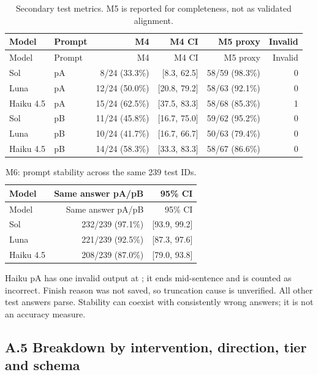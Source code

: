 \begingroup\small\setlength{\tabcolsep}{4pt}
\begin{longtable}{llrrrr}
\caption{Secondary test metrics. M5 is reported for completeness, not as validated alignment.}\\
\toprule
Model & Prompt & M4 & M4 CI & M5 proxy & Invalid \\
\midrule\endfirsthead
\toprule
Model & Prompt & M4 & M4 CI & M5 proxy & Invalid \\
\midrule\endhead
\bottomrule\endfoot
Sol & pA & 8/24 (33.3\%) & [8.3, 62.5] & 58/59 (98.3\%) & 0 \\
Luna & pA & 12/24 (50.0\%) & [20.8, 79.2] & 58/63 (92.1\%) & 0 \\
Haiku 4.5 & pA & 15/24 (62.5\%) & [37.5, 83.3] & 58/68 (85.3\%) & 1 \\
Sol & pB & 11/24 (45.8\%) & [16.7, 75.0] & 59/62 (95.2\%) & 0 \\
Luna & pB & 10/24 (41.7\%) & [16.7, 66.7] & 50/63 (79.4\%) & 0 \\
Haiku 4.5 & pB & 14/24 (58.3\%) & [33.3, 83.3] & 58/67 (86.6\%) & 0 \\
\end{longtable}\endgroup


\begingroup\small\setlength{\tabcolsep}{4pt}
\begin{longtable}{lrr}
\caption{M6: prompt stability across the same 239 test IDs.}\\
\toprule
Model & Same answer pA/pB & 95\% CI \\
\midrule\endfirsthead
\toprule
Model & Same answer pA/pB & 95\% CI \\
\midrule\endhead
\bottomrule\endfoot
Sol & 232/239 (97.1\%) & [93.9, 99.2] \\
Luna & 221/239 (92.5\%) & [87.3, 97.6] \\
Haiku 4.5 & 208/239 (87.0\%) & [79.0, 93.8] \\
\end{longtable}\endgroup


Haiku pA has one invalid output at ; it ends mid-sentence and is counted as incorrect. Finish reason was not saved, so truncation cause is unverified. All other test answers parse. Stability can coexist with consistently wrong answers; it is not an accuracy measure.

\subsection*{A.5 Breakdown by intervention, direction, tier and schema}

